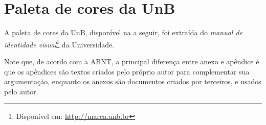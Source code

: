 \chapter{Paleta de cores da UnB}\label{anx:coresunb}

A paleta de cores da UnB, disponível na  a seguir, foi extraída do \emph{manual de identidade visual}\footnote{Disponível em: \url{http://marca.unb.br}} da Universidade.

Note que, de acordo com a ABNT, a principal diferença entre anexo e apêndice é que os apêndices são textos criados pelo próprio autor para complementar sua argumentação, enquanto os anexos são documentos criados por terceiros, e usados pelo autor.

\cleardoublepage




\cleardoublepage